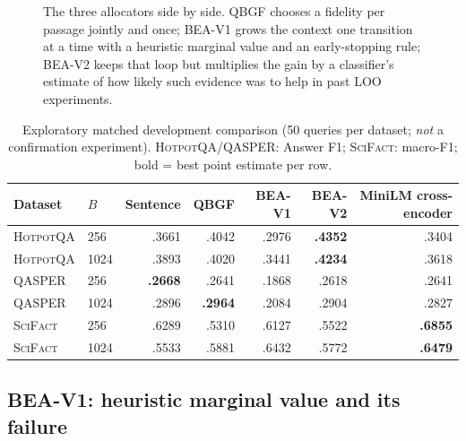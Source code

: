 \documentclass[10pt,twocolumn,letterpaper]{article}
\newcommand{\qbgf}{\textsc{QBGF}\xspace}
\newcommand{\vone}{\textsc{BEA-V1}\xspace}
\newcommand{\vtwo}{\textsc{BEA-V2}\xspace}
\newcommand{\hotpot}{\textsc{HotpotQA}\xspace}
\newcommand{\qasper}{\textsc{QASPER}\xspace}
\newcommand{\scifact}{\textsc{SciFact}\xspace}
\newcommand{\Phelp}{P_{\mathrm{help}}}
\newcommand{\SmallTable}{\footnotesize\setlength{\tabcolsep}{3.6pt}}
\begin{document}
\begin{figure}[t]
\caption{The three allocators side by side. \qbgf chooses a fidelity per passage jointly and once; \vone grows the context one transition at a time with a heuristic marginal value and an early-stopping rule; \vtwo keeps that loop but multiplies the gain by a classifier's estimate of how likely such evidence was to help in past LOO experiments.}\label{fig:cmp}
\end{figure}

\begin{table}[t]\centering\SmallTable
\caption{Exploratory matched development comparison (50 queries per dataset; \emph{not} a confirmation experiment). \hotpot/\qasper: Answer F1; \scifact: macro-F1; bold = best point estimate per row.}\label{tab:bea}
\begin{tabular}{llrrrrr}\toprule
Dataset & $B$ & Sentence & \qbgf & \vone & \vtwo & MiniLM cross-encoder\\\midrule
\hotpot & 256 & .3661 & .4042 & .2976 & \textbf{.4352} & .3404\\
\hotpot & 1024 & .3893 & .4020 & .3441 & \textbf{.4234} & .3618\\
\qasper & 256 & \textbf{.2668} & .2641 & .1868 & .2618 & .2641\\
\qasper & 1024 & .2896 & \textbf{.2964} & .2084 & .2904 & .2827\\
\scifact & 256 & .6289 & .5310 & .6127 & .5522 & \textbf{.6855}\\
\scifact & 1024 & .5533 & .5881 & .6432 & .5772 & \textbf{.6479}\\\bottomrule
\end{tabular}\end{table}

\subsection{BEA-V1: heuristic marginal value and its failure}
\end{document}

